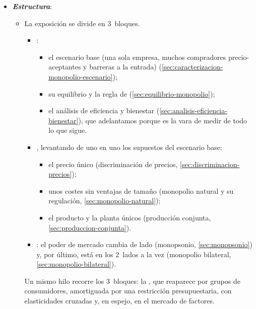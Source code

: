\documentclass[11pt]{article}
\begin{document}
\begin{itemize}
\item \textbf{\emph{Estructura}}:
  \begin{itemize}
  \item La exposición se divide en 3~bloques.
  \begin{itemize}
  \item {}:
    \begin{itemize}
    \item el escenario base (una sola empresa, muchos compradores precio-aceptantes y barreras a la entrada) (\ref{sec:caracterizacion-monopolio-escenario});
    \item su equilibrio y la regla de  (\ref{sec:equilibrio-monopolio});
    \item el análisis de eficiencia y bienestar (\ref{sec:analisis-eficiencia-bienestar}), que adelantamos porque es la vara de medir de todo lo que sigue.
    \end{itemize}
  \item {}, levantando de uno en uno los supuestos del escenario base:
    \begin{itemize}
    \item el precio único (discriminación de precios, \ref{sec:discriminacion-precios});
    \item unos costes sin ventajas de tamaño (monopolio natural y su regulación, \ref{sec:monopolio-natural});
    \item el producto y la planta únicos (producción conjunta, \ref{sec:produccion-conjunta}).
    \end{itemize}
  \item {}: el poder de mercado cambia de lado (monopsonio, \ref{sec:monopsonio}) y, por último, está en los 2~lados a la vez (monopolio bilateral, \ref{sec:monopolio-bilateral}).
  \end{itemize}
  Un mismo hilo recorre los 3~bloques: la , que reaparece por grupos de consumidores, amortiguada por una restricción presupuestaria, con elasticidades cruzadas y, en espejo, en el mercado de factores.
  \end{itemize}
\end{itemize}
\end{document}
